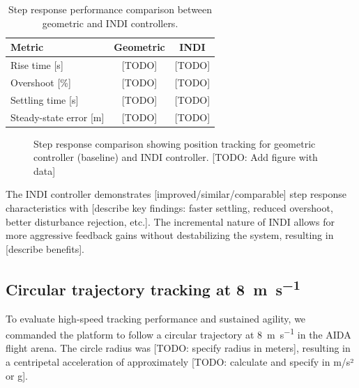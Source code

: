 \begin{table}[htbp]
\centering
\caption{Step response performance comparison between geometric and INDI controllers.}
\label{tab:step_response_comparison}
\begin{tabular}{lcc}
\hline
\textbf{Metric} & \textbf{Geometric} & \textbf{INDI} \\
\hline
Rise time [\si{\second}] & [TODO] & [TODO] \\
Overshoot [\%] & [TODO] & [TODO] \\
Settling time [\si{\second}] & [TODO] & [TODO] \\
Steady-state error [\si{\meter}] & [TODO] & [TODO] \\
\hline
\end{tabular}
\end{table}

\begin{figure}[htbp]
  \centering
  \caption{Step response comparison showing position tracking for geometric controller (baseline) and INDI controller. [TODO: Add figure with data]}
  \label{fig:step_response_comparison}
\end{figure}

The INDI controller demonstrates [improved/similar/comparable] step response characteristics with [describe key findings: faster settling, reduced overshoot, better disturbance rejection, etc.]. The incremental nature of INDI allows for more aggressive feedback gains without destabilizing the system, resulting in [describe benefits].

\subsection{Circular trajectory tracking at \SI{8}{\meter\per\second}}

To evaluate high-speed tracking performance and sustained agility, we commanded the platform to follow a circular trajectory at \SI{8}{\meter\per\second} in the AIDA flight arena. The circle radius was [TODO: specify radius in meters], resulting in a centripetal acceleration of approximately [TODO: calculate and specify in m/s² or g].

